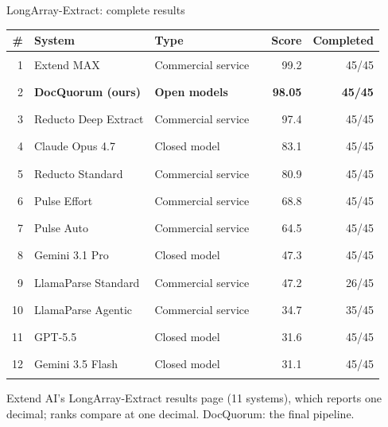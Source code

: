 \documentclass[aspectratio=169,10pt]{beamer}
\newcommand{\src}[1]{\par\vfill{\tiny\color{muted}#1\par}}
\begin{document}
\begin{frame}{LongArray-Extract: complete results}
\begingroup\footnotesize\renewcommand{\arraystretch}{1.02}\setlength{\tabcolsep}{4pt}
\begin{tabularx}{\textwidth}{@{}rYl@{\hspace{6pt}}lrr@{}}\toprule
\textbf{\#} & \textbf{System} & \textbf{Type} &  & \textbf{Score} & \textbf{Completed}\\ & Extend MAX & {\color{routeB}Commercial service} & \textcolor{routeB!45}{\rule{1.19cm}{1.05ex}} & 99.2 & 45/45\\
2 & \textbf{DocQuorum (ours)} & {\color{good}\textbf{Open models}} & \textcolor{good}{\rule{1.18cm}{1.05ex}} & \textbf{98.05} & \textbf{45/45}\\
3 & Reducto Deep Extract & {\color{routeB}Commercial service} & \textcolor{routeB!45}{\rule{1.17cm}{1.05ex}} & 97.4 & 45/45\\
4 & Claude Opus 4.7 & {\color{muted}Closed model} & \textcolor{muted!45}{\rule{1.00cm}{1.05ex}} & 83.1 & 45/45\\
5 & Reducto Standard & {\color{routeB}Commercial service} & \textcolor{routeB!45}{\rule{0.97cm}{1.05ex}} & 80.9 & 45/45\\
6 & Pulse Effort & {\color{routeB}Commercial service} & \textcolor{routeB!45}{\rule{0.83cm}{1.05ex}} & 68.8 & 45/45\\
7 & Pulse Auto & {\color{routeB}Commercial service} & \textcolor{routeB!45}{\rule{0.77cm}{1.05ex}} & 64.5 & 45/45\\
8 & Gemini 3.1 Pro & {\color{muted}Closed model} & \textcolor{muted!45}{\rule{0.57cm}{1.05ex}} & 47.3 & 45/45\\
9 & LlamaParse Standard & {\color{routeB}Commercial service} & \textcolor{routeB!45}{\rule{0.57cm}{1.05ex}} & 47.2 & 26/45\\
10 & LlamaParse Agentic & {\color{routeB}Commercial service} & \textcolor{routeB!45}{\rule{0.42cm}{1.05ex}} & 34.7 & 35/45\\
11 & GPT-5.5 & {\color{muted}Closed model} & \textcolor{muted!45}{\rule{0.38cm}{1.05ex}} & 31.6 & 45/45\\
12 & Gemini 3.5 Flash & {\color{muted}Closed model} & \textcolor{muted!45}{\rule{0.37cm}{1.05ex}} & 31.1 & 45/45\\
\bottomrule\end{tabularx}\endgroup

\src{Extend AI's LongArray-Extract results page (11 systems), which reports one decimal; ranks compare at one decimal. DocQuorum: the final pipeline.}
\end{frame}
\end{document}
